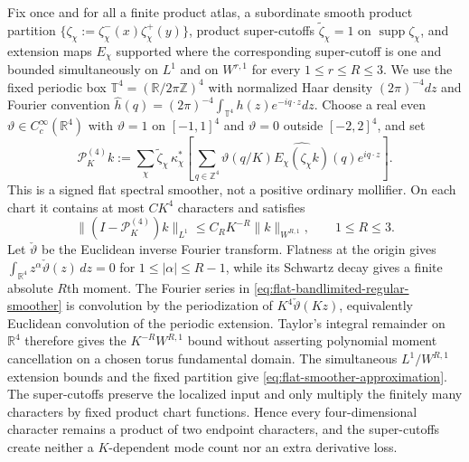 \documentclass[11pt]{article}
\begin{document}
Fix once and for all a finite product atlas, a subordinate smooth product
partition $\{\zeta_\chi:=\zeta_\chi^-(x)\zeta_\chi^+(y)\}$, product super-cutoffs
$\widetilde\zeta_\chi=1$ on $\operatorname{supp}\zeta_\chi$, and extension
maps $E_\chi$ supported where the corresponding super-cutoff is one and
bounded simultaneously on $L^1$ and on $W^{r,1}$ for every
$1\le r\le R\le3$.  We use the fixed periodic box
$\mathbb T^4=(\mathbb R/2\pi\mathbb Z)^4$ with normalized Haar density
$(2\pi)^{-4}dz$ and Fourier convention
$\widehat h(q)=(2\pi)^{-4}\int_{\mathbb T^4}h(z)e^{-iq\cdot z}dz$.
Choose a real even
$\vartheta\in C_c^\infty(\mathbb R^4)$ with
$\vartheta=1$ on $[-1,1]^4$ and $\vartheta=0$ outside $[-2,2]^4$, and set
\begin{equation}
\label{eq:flat-bandlimited-regular-smoother}
 \mathcal P_K^{(4)}k
 :=\sum_\chi\widetilde\zeta_\chi\,
   \kappa_\chi^*\!\left[
    \sum_{q\in\mathbb Z^4}\vartheta(q/K)
      \widehat{E_\chi(\zeta_\chi k)}(q)e^{iq\cdot z}
   \right].
\end{equation}
This is a signed flat spectral smoother, not a positive ordinary mollifier.
On each chart it contains at most $CK^4$ characters and satisfies
\begin{equation}
\label{eq:flat-smoother-approximation}
 \|(I-\mathcal P_K^{(4)})k\|_{L^1}
 \le C_RK^{-R}\|k\|_{W^{R,1}},\qquad 1\le R\le3.
\end{equation}
Let $\check\vartheta$ be the Euclidean inverse Fourier transform.  Flatness
at the origin gives
$\int_{\mathbb R^4}z^\alpha\check\vartheta(z)\,dz=0$ for
$1\le|\alpha|\le R-1$, while its Schwartz decay gives a finite absolute
$R$th moment.  The Fourier series in
\eqref{eq:flat-bandlimited-regular-smoother} is convolution by the
periodization of $K^4\check\vartheta(Kz)$, equivalently Euclidean convolution
of the periodic extension.  Taylor's integral remainder on $\mathbb R^4$
therefore gives the $K^{-R}W^{R,1}$ bound without asserting polynomial
moment cancellation on a chosen torus fundamental domain.  The simultaneous
$L^1/W^{R,1}$ extension bounds and the fixed partition give
\eqref{eq:flat-smoother-approximation}.  The super-cutoffs preserve the
localized input and only multiply the finitely many characters by fixed
product chart functions.  Hence every four-dimensional character remains a
product of two endpoint characters, and the super-cutoffs create neither a
$K$-dependent mode count nor an extra derivative loss.
\end{document}
